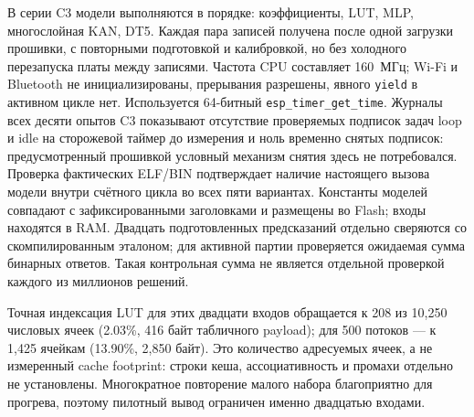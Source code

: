 В серии C3 модели выполняются в порядке: коэффициенты, LUT, MLP, многослойная KAN, DT5. Каждая пара записей получена после одной загрузки прошивки, с повторными подготовкой и калибровкой, но без холодного перезапуска платы между записями. Частота CPU составляет 160~МГц; Wi-Fi и Bluetooth не инициализированы, прерывания разрешены, явного \texttt{yield} в активном цикле нет. Используется 64-битный \texttt{esp\_timer\_get\_time}. Журналы всех десяти опытов C3 показывают отсутствие проверяемых подписок задач loop и idle на сторожевой таймер до измерения и ноль временно снятых подписок: предусмотренный прошивкой условный механизм снятия здесь не потребовался. Проверка фактических ELF/BIN подтверждает наличие настоящего вызова модели внутри счётного цикла во всех пяти вариантах. Константы моделей совпадают с зафиксированными заголовками и размещены во Flash; входы находятся в RAM. Двадцать подготовленных предсказаний отдельно сверяются со скомпилированным эталоном; для активной партии проверяется ожидаемая сумма бинарных ответов. Такая контрольная сумма не является отдельной проверкой каждого из миллионов решений.

Точная индексация LUT для этих двадцати входов обращается к 208 из 10,250 числовых ячеек (2.03\%, 416 байт табличного payload); для 500 потоков --- к 1,425 ячейкам (13.90\%, 2,850 байт). Это количество адресуемых ячеек, а не измеренный cache footprint: строки кеша, ассоциативность и промахи отдельно не установлены. Многократное повторение малого набора благоприятно для прогрева, поэтому пилотный вывод ограничен именно двадцатью входами.

